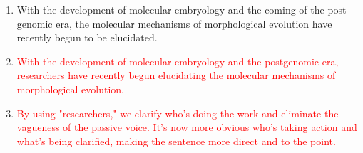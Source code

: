 \documentclass{article}
\newcommand{\red}[1]{\textcolor{red}{#1}}
\begin{document}
\begin{enumerate}
    \item With the development of molecular embryology and the coming of the post-genomic era, the molecular mechanisms of morphological evolution have recently begun to be elucidated.
    \item[] \red{With the development of molecular embryology and the postgenomic era, researchers have recently begun elucidating the molecular mechanisms of morphological evolution.}
    \item[] \red{By using "researchers," we clarify who’s doing the work and eliminate the vagueness of the passive voice. It’s now more obvious who’s taking action and what’s being clarified, making the sentence more direct and to the point.}
    
\end{enumerate}
\end{document}
